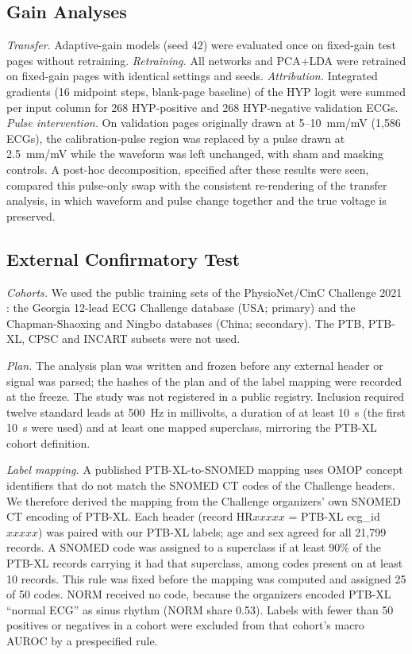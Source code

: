 \documentclass[journal]{IEEEtran}
\begin{document}
\subsection{Gain Analyses}
\emph{Transfer.} Adaptive-gain models (seed 42) were evaluated once on fixed-gain test pages without retraining. \emph{Retraining.} All networks and PCA+LDA were retrained on fixed-gain pages with identical settings and seeds. \emph{Attribution.} Integrated gradients \cite{sundararajan2017ig} (16 midpoint steps, blank-page baseline) of the HYP logit were summed per input column for 268 HYP-positive and 268 HYP-negative validation ECGs. \emph{Pulse intervention.} On validation pages originally drawn at 5--10~mm/mV (1{,}586 ECGs), the calibration-pulse region was replaced by a pulse drawn at 2.5~mm/mV while the waveform was left unchanged, with sham and masking controls. A post-hoc decomposition, specified after these results were seen, compared this pulse-only swap with the consistent re-rendering of the transfer analysis, in which waveform and pulse change together and the true voltage is preserved.

\subsection{External Confirmatory Test}\label{sec:external}
\emph{Cohorts.} We used the public training sets of the PhysioNet/CinC Challenge 2021 \cite{reyna2021challenge,reyna2022challengedata}: the Georgia 12-lead ECG Challenge database (USA; primary) and the Chapman-Shaoxing \cite{zheng2020chapman} and Ningbo \cite{zheng2022ningbo} databases (China; secondary). The PTB, PTB-XL, CPSC and INCART subsets were not used.

\emph{Plan.} The analysis plan was written and frozen before any external header or signal was parsed; the hashes of the plan and of the label mapping were recorded at the freeze. The study was not registered in a public registry. Inclusion required twelve standard leads at 500~Hz in millivolts, a duration of at least 10~s (the first 10~s were used) and at least one mapped superclass, mirroring the PTB-XL cohort definition.

\emph{Label mapping.} A published PTB-XL-to-SNOMED mapping \cite{strodthoff2023ptbxlplus,strodthoff2023ptbxlplusdata} uses OMOP concept identifiers that do not match the SNOMED CT codes of the Challenge headers. We therefore derived the mapping from the Challenge organizers' own SNOMED CT encoding of PTB-XL. Each header (record HR$xxxxx$ = PTB-XL ecg\_id $xxxxx$) was paired with our PTB-XL labels; age and sex agreed for all 21{,}799 records. A SNOMED code was assigned to a superclass if at least 90\% of the PTB-XL records carrying it had that superclass, among codes present on at least 10 records. This rule was fixed before the mapping was computed and assigned 25 of 50 codes. NORM received no code, because the organizers encoded PTB-XL ``normal ECG'' as sinus rhythm (NORM share 0.53). Labels with fewer than 50 positives or negatives in a cohort were excluded from that cohort's macro AUROC by a prespecified rule.
\end{document}
